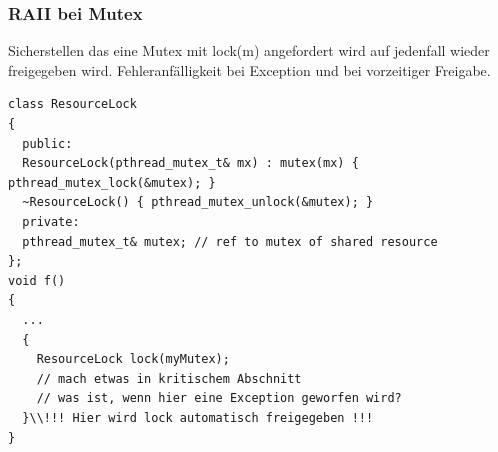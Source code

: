 \subsubsection{RAII bei Mutex}
Sicherstellen das eine Mutex mit lock(m) angefordert wird auf jedenfall wieder freigegeben wird. 
Fehleranfälligkeit bei Exception und bei vorzeitiger Freigabe.
\begin{lstlisting}
class ResourceLock
{
  public:
  ResourceLock(pthread_mutex_t& mx) : mutex(mx) { pthread_mutex_lock(&mutex); }
  ~ResourceLock() { pthread_mutex_unlock(&mutex); }
  private:
  pthread_mutex_t& mutex; // ref to mutex of shared resource
};
void f()
{
  ...
  {
    ResourceLock lock(myMutex);
    // mach etwas in kritischem Abschnitt
    // was ist, wenn hier eine Exception geworfen wird?
  }\\!!! Hier wird lock automatisch freigegeben !!!
}
\end{lstlisting}

\newpage

